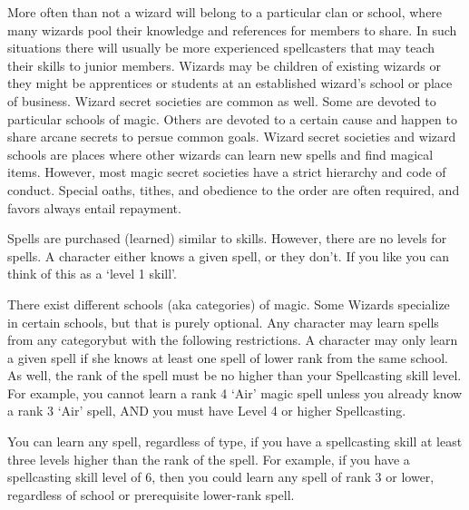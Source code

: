 \documentclass[twoside]{book}
\begin{document}
    {  
     More often than not a wizard will belong to a
               particular clan or school, where many wizards pool their
               knowledge and references for members to share. In such
               situations there will usually be more experienced
               spellcasters that may teach their skills to junior
               members. Wizards may be children of existing wizards or
               they might be apprentices or students at an established
               wizard's school or place of business. Wizard secret
               societies are common as well. Some are devoted to
               particular schools of magic. Others are devoted to a
               certain cause and happen to share arcane secrets to persue
               common goals. Wizard secret societies and wizard schools
               are places where other wizards can learn new spells and
               find magical items. However, most magic secret societies
               have a strict hierarchy and code of conduct. Special
               oaths, tithes, and obedience to the order are often
               required, and favors always entail repayment. 
    }
  
    {  
     Spells are purchased (learned) similar to skills.
               However, there are no levels for spells. A character
               either knows a given spell, or they don't. If you
               like you can think of this as a `level 1
               skill'. 
    }
  
    {  
     There exist different schools (aka categories) of
               magic. Some Wizards specialize in certain schools, but
               that is purely optional. Any character may learn spells
               from any categorybut with the following
               restrictions. A character may only learn a given spell if
               she knows at least one spell of lower rank from the same
               school. As well, the rank of the spell must be no higher
               than your Spellcasting skill level. For example, you
               cannot learn a rank 4 `Air' magic spell unless
               you already know a rank 3 `Air' spell, AND you
               must have Level 4 or higher Spellcasting. 
    }
  
    {  
     You can learn any spell, regardless of type, if you
               have a spellcasting skill at least three levels higher
               than the rank of the spell. For example, if you have a
               spellcasting skill level of 6, then you could learn any
               spell of rank 3 or lower, regardless of school or
               prerequisite lower-rank spell. 
    }
  
\end{document}
